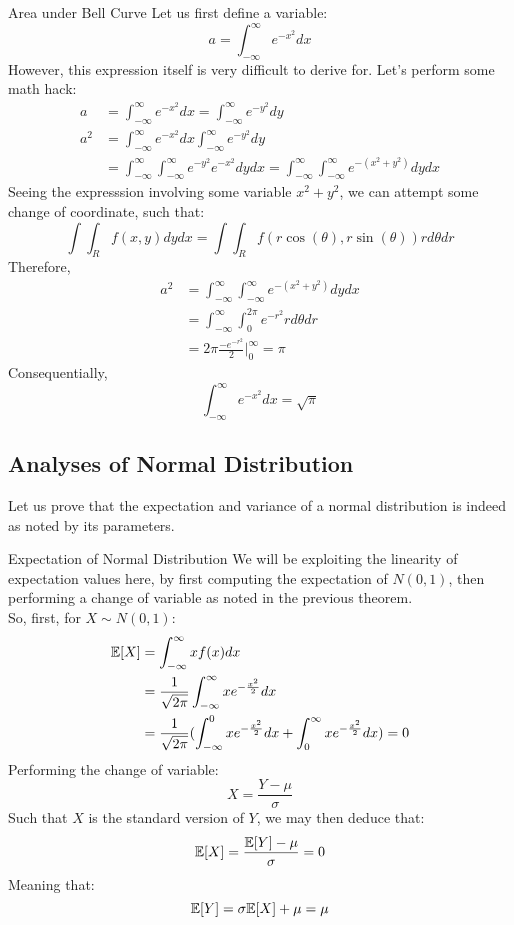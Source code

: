 \begin{ln-think}{Area under Bell Curve}{}
    Let us first define a variable:
    \[a = \int_{-\infty}^{\infty} e^{-x^2} dx\]
    However, this expression itself is very difficult to derive for. Let's perform some math hack: \\
    \begin{align*}
        a &= \int_{-\infty}^{\infty} e^{-x^2} dx = \int_{-\infty}^{\infty} e^{-y^2} dy \\
        a^2 &= \int_{-\infty}^{\infty} e^{-x^2} dx \int_{-\infty}^{\infty} e^{-y^2} dy \\
        &= \int_{-\infty}^{\infty} \int_{-\infty}^{\infty} e^{-y^2} e^{-x^2} dy dx = \int_{-\infty}^{\infty} \int_{-\infty}^{\infty} e^{-(x^2 +y^2)} dy dx
    \end{align*}
    Seeing the expresssion involving some variable $x^2 + y^2$, we can attempt some change of coordinate, such that:
    \[
        \int \int_R f(x, y) dy dx = \int \int_R f(r \cos(\theta), r \sin(\theta)) r d\theta dr
    \]
    Therefore,
    \begin{align*}
        a^2
        &= \int_{-\infty}^{\infty} \int_{-\infty}^{\infty} e^{-(x^2 +y^2)} dy dx \\
        &= \int_{-\infty}^{\infty} \int_0^{2\pi} e^{-r^2} r d\theta dr \\
        &= 2\pi \frac{-e^{-r^2}}{2} \bigg|_{0}^{\infty} = \pi
    \end{align*}
    Consequentially,
    \[\int_{-\infty}^{\infty} e^{-x^2} dx = \sqrt{\pi}\]
\end{ln-think}

\subsection{Analyses of Normal Distribution}
Let us prove that the expectation and variance of a normal distribution is indeed as noted by its parameters.
\begin{ln-theorem}{Expectation of Normal Distribution}{}
    We will be exploiting the linearity of expectation values here, by first computing the expectation of $N(0, 1)$, then performing a change of variable as noted in the previous theorem. \\
    So, first, for $X \sim N(0, 1)$:
    \begin{align*}
        \mathbb{E}[X] &= \int_{-\infty}^{\infty} x f(x) dx \\
        &= \frac{1}{\sqrt{2\pi}} \int_{-\infty}^{\infty} x e^{-\frac{x^2}{2}} dx \\
        &= \frac{1}{\sqrt{2\pi}} (\int_{-\infty}^{0} x e^{-\frac{x^2}{2}} dx + \int_{0}^{\infty} x e^{-\frac{x^2}{2}} dx) = 0
    \end{align*}
    Performing the change of variable:
    \[X = \frac{Y - \mu}{\sigma}\]
    Such that $X$ is the standard version of $Y$, we may then deduce that:
    \[
        \mathbb{E}[X] = \frac{\mathbb{E}[Y] - \mu}{\sigma} = 0
    \]
    Meaning that:
    \[\mathbb{E}[Y] = \sigma\mathbb{E}[X] + \mu = \mu\]
\end{ln-theorem}

